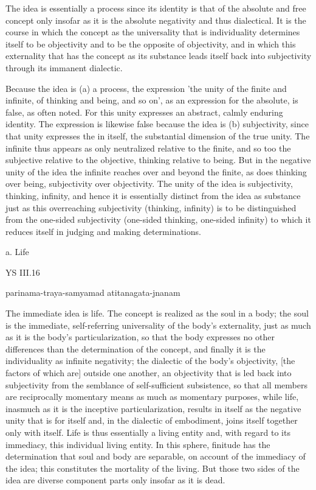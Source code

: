 The idea is essentially a process since its identity is
that of the absolute and free concept only insofar as
it is the absolute negativity and thus dialectical.
It is the course in which the concept
as the universality that is individuality
determines itself to be objectivity
and to be the opposite of objectivity,
and in which this externality
that has the concept as its substance leads
itself back into subjectivity
through its immanent dialectic.

Because the idea is (a) a process, the expression
'the unity of the finite and infinite,
of thinking and being, and so on',
as an expression for the absolute,
is false, as often noted.
For this unity expresses
an abstract, calmly enduring identity.
The expression is likewise false
because the idea is (b) subjectivity,
since that unity expresses the in itself,
the substantial dimension of the true unity.
The infinite thus appears as
only neutralized relative to the finite,
and so too the subjective relative to the objective,
thinking relative to being.
But in the negative unity of the idea
the infinite reaches over and beyond the finite,
as does thinking over being,
subjectivity over objectivity.
The unity of the idea is
subjectivity, thinking, infinity,
and hence it is essentially distinct
from the idea as substance
just as this overreaching subjectivity (thinking, infinity)
is to be distinguished from the one-sided subjectivity
(one-sided thinking, one-sided infinity)
to which it reduces itself in
judging and making determinations.

a. Life

YS III.16

parinama-traya-samyamad atitanagata-jnanam

The immediate idea is life.
The concept is realized as the soul in a body;
the soul is the immediate, self-referring universality of the body's externality,
just as much as it is the body's particularization, so that the body expresses
no other differences than the determination of the concept, and finally
it is the individuality as infinite negativity;
the dialectic of the body's objectivity,
[the factors of which are] outside one another,
an objectivity that is led back into subjectivity from the semblance of self-sufficient
subsistence, so that all members are reciprocally momentary means as
much as momentary purposes, while life, inasmuch as it is the inceptive
particularization, results in itself as the negative unity that is for itself and,
in the dialectic of embodiment, joins itself together only with itself.
Life is thus essentially a living entity and, with regard to its immediacy,
this individual living entity.
In this sphere, finitude has the determination that soul and body are separable,
on account of the immediacy of the idea;
this constitutes the mortality of the living.
But those two sides of the idea are diverse component parts
only insofar as it is dead.

